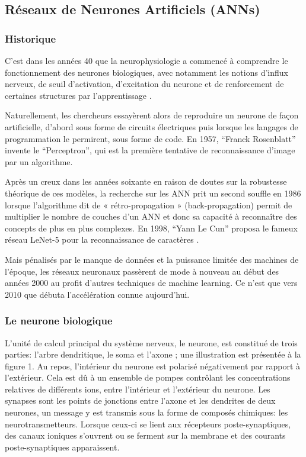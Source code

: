 \documentclass[12pt]{article}
\begin{document}
\subsection{Réseaux de Neurones Artificiels (ANNs)}
\subsubsection{Historique}
C’est dans les années 40 que la neurophysiologie a commencé à comprendre le fonctionnement des neurones biologiques, avec notamment les notions d’influx nerveux, de seuil d’activation, d’excitation du neurone et de renforcement de certaines structures par l’apprentissage \cite{11}.

Naturellement, les chercheurs essayèrent alors de reproduire un neurone de façon artificielle, d’abord sous forme de circuits électriques puis lorsque les langages de programmation le permirent, sous forme de code. En 1957, “Franck Rosenblatt” invente le “Perceptron”, qui est la première tentative de reconnaissance d’image par un algorithme.

Après un creux dans les années soixante en raison de doutes sur la robustesse théorique de ces modèles, la recherche sur les ANN prit un second souffle en 1986 lorsque l’algorithme dit de « rétro-propagation » (back-propagation) permit de multiplier le nombre de couches d’un ANN et donc sa capacité à reconnaître des concepts de plus en plus complexes. En 1998, “Yann Le Cun” proposa le fameux réseau LeNet-5 pour la reconnaissance de caractères \cite{11}.

Mais pénalisés par le manque de données et la puissance limitée des machines de l’époque, les réseaux neuronaux passèrent de mode à nouveau au début des années 2000 au profit d’autres techniques de machine learning. Ce n’est que vers 2010 que débuta l’accélération connue aujourd’hui.
\subsubsection{Le neurone biologique}
L’unité de calcul principal du système nerveux, le neurone, est constitué de trois parties: l’arbre dendritique, le soma et l’axone ; une illustration est présentée à la figure 1. Au repos, l’intérieur du neurone est polarisé négativement par rapport à l’extérieur. Cela est dû à un ensemble de pompes contrôlant les concentrations relatives de différents ions, entre l’intérieur et l’extérieur du neurone. Les synapses sont les points de jonctions entre l’axone et les dendrites de deux neurones, un message y est transmis sous la forme de composés chimiques: les neurotransmetteurs. Lorsque ceux-ci se lient aux récepteurs poste-synaptiques, des canaux ioniques s’ouvrent ou se ferment sur la membrane et des courants poste-synaptiques apparaissent.
\end{document}
